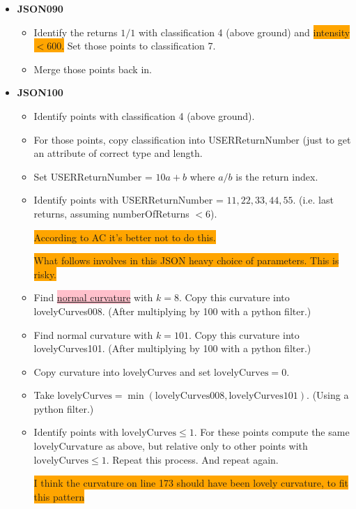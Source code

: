 \documentclass[a4paper,11pt,twoside]{article}
\theoremstyle{definition}
\theoremstyle{remark}
\newcommand{\sh}[1]{\colorbox{pink}{#1}}
\newcommand{\bad}[1]{\colorbox{orange}{#1}}
\begin{document}
\begin{itemize}
\begin{itemize}
\begin{center}
\end{center}
\end{itemize}
\item \textbf{JSON090}
\begin{itemize}
\item Identify the returns $1/1$ with classification 4 (above ground) and \bad{intensity $<600$.} Set those points to classification 7.
\item Merge those points back in.
\end{itemize}
\item \textbf{JSON100}
\begin{itemize}
\item Identify points with classification 4 (above ground).
\item For those points, copy classification into USERReturnNumber (just to get an attribute of correct type and length.
\item Set USERReturnNumber = $10a+b$ where $a/b$ is the return index.
\item Identify points with USERReturnNumber = $11,22,33,44,55$. (i.e. last returns, assuming numberOfReturns $<6$).
\begin{center}
\bad{According to AC it's better not to do this.}
\end{center}
\begin{center}
\bad{What follows involves in this JSON heavy choice of parameters. This is risky.}
\end{center}
\item Find \hyperref[roc]{\sh{normal curvature}} with $k=8$. Copy this curvature into lovelyCurves008. (After multiplying by 100 with a python filter.)
\item Find normal curvature with $k=101$. Copy this curvature into lovelyCurves101. (After multiplying by 100 with a python filter.)
\item Copy curvature into lovelyCurves and set $\mathrm{lovelyCurves}=0$.
\item Take $\mathrm{lovelyCurves}=\min(\mathrm{lovelyCurves008},\mathrm{lovelyCurves101})$. (Using a python filter.)
\item Identify points with $\mathrm{lovelyCurves}\leqslant 1$. For these points compute the same $\mathrm{lovelyCurvature}$ as above, but relative only to other points with $\mathrm{lovelyCurves}\leqslant 1$. Repeat this process. And repeat again.
\begin{center}
\bad{I think the curvature on line 173 should have been lovely curvature, to fit this pattern}
\end{center}

\end{itemize}
\end{itemize}
\end{document}
